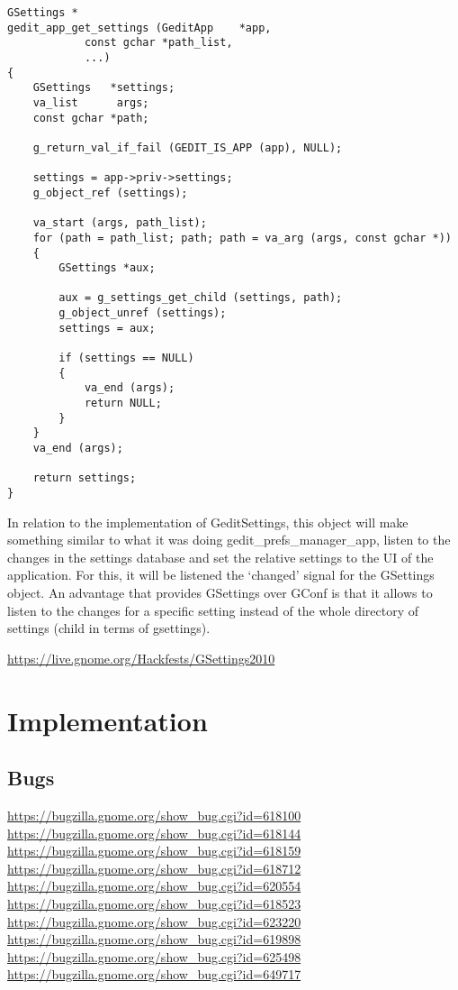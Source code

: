 \begin{lstlisting}[style=GObject]
GSettings *
gedit_app_get_settings (GeditApp    *app,
			const gchar *path_list,
			...)
{
	GSettings   *settings;
	va_list      args;
	const gchar *path;

	g_return_val_if_fail (GEDIT_IS_APP (app), NULL);

	settings = app->priv->settings;
	g_object_ref (settings);

	va_start (args, path_list);
	for (path = path_list; path; path = va_arg (args, const gchar *))
	{
		GSettings *aux;

		aux = g_settings_get_child (settings, path);
		g_object_unref (settings);
		settings = aux;

		if (settings == NULL)
		{
			va_end (args);
			return NULL;
		}
	}
	va_end (args);

	return settings;
}
\end{lstlisting}

In relation to the implementation of GeditSettings, this object will make something similar to what it was doing gedit\_prefs\_manager\_app, listen to the changes in the settings database and set the relative settings to the UI of the application. For this, it will be listened the `changed' signal for the GSettings object. An advantage that provides GSettings over GConf is that it allows to listen to the changes for a specific setting instead of the whole directory of settings (child in terms of gsettings).

\url{https://live.gnome.org/Hackfests/GSettings2010}

\section{Implementation}

\subsection{Bugs}

\noindent\url{https://bugzilla.gnome.org/show_bug.cgi?id=618100}\\
\noindent\url{https://bugzilla.gnome.org/show_bug.cgi?id=618144}\\
\noindent\url{https://bugzilla.gnome.org/show_bug.cgi?id=618159}\\
\noindent\url{https://bugzilla.gnome.org/show_bug.cgi?id=618712}\\
\noindent\url{https://bugzilla.gnome.org/show_bug.cgi?id=620554}\\
\noindent\url{https://bugzilla.gnome.org/show_bug.cgi?id=618523}\\
\noindent\url{https://bugzilla.gnome.org/show_bug.cgi?id=623220}\\
\noindent\url{https://bugzilla.gnome.org/show_bug.cgi?id=619898}\\
\noindent\url{https://bugzilla.gnome.org/show_bug.cgi?id=625498}\\
\noindent\url{https://bugzilla.gnome.org/show_bug.cgi?id=649717}
